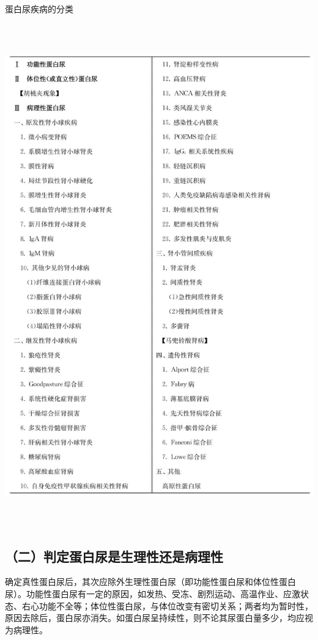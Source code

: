 \begin{table}[htbp]
\centering
\caption{蛋白尿疾病的分类}
\label{tab37-1}
\includegraphics[width=5.97917in,height=8.5625in]{./images/Image00232.jpg}
\end{table}

\subsection{（二）判定蛋白尿是生理性还是病理性}

确定真性蛋白尿后，其次应除外生理性蛋白尿（即功能性蛋白尿和体位性蛋白尿）。功能性蛋白尿有一定的原因，如发热、受冻、剧烈运动、高温作业、应激状态、右心功能不全等；体位性蛋白尿，与体位改变有密切关系；两者均为暂时性，原因去除后，蛋白尿亦消失。如蛋白尿呈持续性，则不论其尿蛋白量多少，均应视为病理性。

